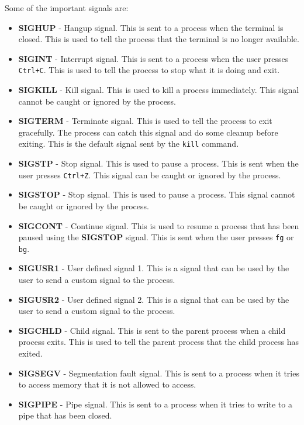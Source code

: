 Some of the important signals are:

\begin{itemize}
  \item \textbf{SIGHUP} - Hangup signal. This is sent to a process when the
  terminal is closed. This is used to tell the process that the terminal
  is no longer available.
\item \textbf{SIGINT} - Interrupt signal. This is sent to a process when the
  user presses \lstinline|Ctrl+C|. This is used to tell the process to stop
  what it is doing and exit.
\item \textbf{SIGKILL} - Kill signal. This is used to kill a process immediately.
  This signal cannot be caught or ignored by the process.
\item \textbf{SIGTERM} - Terminate signal. This is used to tell the process
  to exit gracefully. The process can catch this signal and do some cleanup
  before exiting. This is the default signal sent by the \lstinline|kill| command.
\item \textbf{SIGSTP} - Stop signal. This is used to pause a process.
  This is sent when the user presses \lstinline|Ctrl+Z|. This signal can be
  caught or ignored by the process.
\item \textbf{SIGSTOP} - Stop signal. This is used to pause a process.
  This signal cannot be caught or ignored by the process.
\item \textbf{SIGCONT} - Continue signal. This is used to resume a process
  that has been paused using the \textbf{SIGSTOP} signal. This is sent
  when the user presses \lstinline|fg| or \lstinline|bg|.
\item \textbf{SIGUSR1} - User defined signal 1. This is a signal that can
  be used by the user to send a custom signal to the process.
\item \textbf{SIGUSR2} - User defined signal 2. This is a signal that can
  be used by the user to send a custom signal to the process.
\item \textbf{SIGCHLD} - Child signal. This is sent to the parent process
  when a child process exits. This is used to tell the parent process that
  the child process has exited.
\item \textbf{SIGSEGV} - Segmentation fault signal. This is sent to a process
  when it tries to access memory that it is not allowed to access.
\item \textbf{SIGPIPE} - Pipe signal. This is sent to a process when it tries
  to write to a pipe that has been closed.
\end{itemize}


